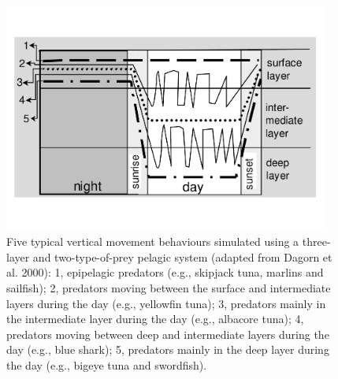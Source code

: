 \begin{figure}[H]  
	\centering
		\includegraphics[width=0.95\textwidth]{intro/figs/Fig_3layersPredators}
	\caption{Five typical vertical movement behaviours simulated using a three-layer and two-type-of-prey pelagic system (adapted from Dagorn et al. 2000): 1, epipelagic predators (e.g., skipjack tuna, marlins and sailfish); 2, predators moving between the surface and intermediate layers during the day (e.g., yellowfin tuna); 3, predators mainly in the intermediate layer during the day (e.g., albacore tuna); 4, predators moving between deep and intermediate layers during the day (e.g., blue shark); 5, predators mainly in the deep layer during the day (e.g., bigeye tuna and swordfish).}
	\label{Predators_3layers}
\end{figure}

